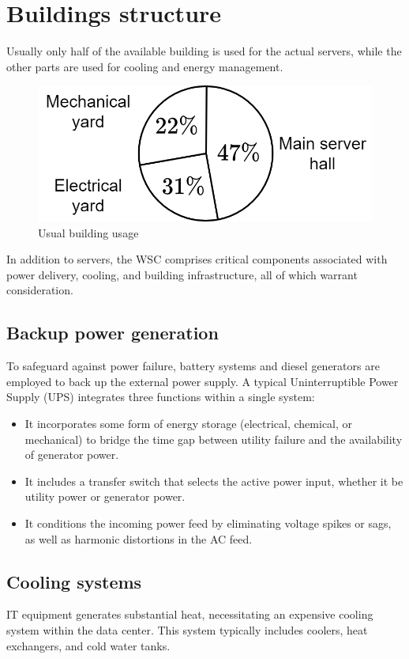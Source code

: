 \section{Buildings structure}

Usually only half of the available building is used for the actual servers, while the other parts are used for cooling and energy management. 
\begin{figure}[H]
    \centering
    \includegraphics[width=0.5\linewidth]{images/build.png}
    \caption{Usual building usage}
\end{figure}
In addition to servers, the WSC comprises critical components associated with power delivery, cooling, and building infrastructure, all of which warrant consideration.

\subsection{Backup power generation}
To safeguard against power failure, battery systems and diesel generators are employed to back up the external power supply.
A typical Uninterruptible Power Supply (UPS) integrates three functions within a single system:
\begin{itemize}
    \item It incorporates some form of energy storage (electrical, chemical, or mechanical) to bridge the time gap between utility failure and the availability of generator power.
    \item It includes a transfer switch that selects the active power input, whether it be utility power or generator power.
    \item It conditions the incoming power feed by eliminating voltage spikes or sags, as well as harmonic distortions in the AC feed.
\end{itemize}

\subsection{Cooling systems}
IT equipment generates substantial heat, necessitating an expensive cooling system within the data center. 
This system typically includes coolers, heat exchangers, and cold water tanks.

